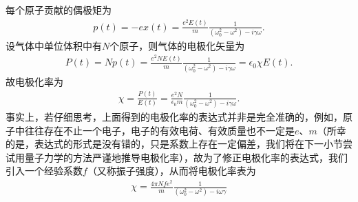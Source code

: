 \documentclass{assignment}
\begin{document}
每个原子贡献的偶极矩为
\begin{align}
    p(t)=-ex(t)=\frac{e^2E(t)}{m}\frac{1}{(\omega_0^2-\omega^2)-i\gamma\omega}.
\end{align}
设气体中单位体积中有$N$个原子，则气体的电极化矢量为
\begin{align}
    P(t)=Np(t)=\frac{e^2NE(t)}{m}\frac{1}{(\omega_0^2-\omega^2)-i\gamma\omega}=\epsilon_0\chi E(t).
\end{align}
故电极化率为
\begin{align}
    \chi=\frac{P(t)}{E(t)}=\frac{e^2N}{\epsilon_0m}\frac{1}{(\omega_0^2-\omega^2)-i\gamma\omega}.
\end{align}
事实上，若仔细思考，上面得到的电极化率的表达式并非是完全准确的，例如，原子中往往存在不止一个电子，电子的有效电荷、有效质量也不一定是$e$、$m$（所幸的是，表达式的形式是没有错的，只是系数上存在一定偏差，我们将在下一小节尝试用量子力学的方法严谨地推导电极化率），故为了修正电极化率的表达式，我们引入一个经验系数$f$（又称振子强度），从而将电极化率表为
\begin{align}
    \chi=\frac{4\pi Nfe^2}{m}\frac{1}{(\omega_0^2-\omega^2)-i\omega\gamma}
\end{align}
\end{document}
